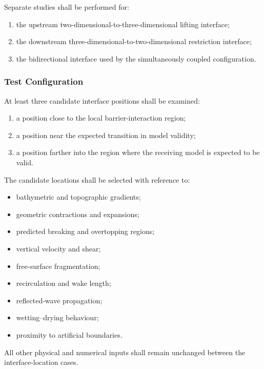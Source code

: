 Separate studies shall be performed for:

\begin{enumerate}
  \item the upstream two-dimensional-to-three-dimensional lifting
    interface;
  \item the downstream three-dimensional-to-two-dimensional
    restriction interface;
  \item the bidirectional interface used by the simultaneously coupled
    configuration.
\end{enumerate}

\subsubsection{Test Configuration}
\label{sec:res-ver-tst-interface-location-configuration}

At least three candidate interface positions shall be examined:

\begin{enumerate}
  \item a position close to the local barrier-interaction region;
  \item a position near the expected transition in model validity;
  \item a position farther into the region where the receiving model
    is expected to be valid.
\end{enumerate}

The candidate locations shall be selected with reference to:

\begin{itemize}
  \item bathymetric and topographic gradients;
  \item geometric contractions and expansions;
  \item predicted breaking and overtopping regions;
  \item vertical velocity and shear;
  \item free-surface fragmentation;
  \item recirculation and wake length;
  \item reflected-wave propagation;
  \item wetting--drying behaviour;
  \item proximity to artificial boundaries.
\end{itemize}

All other physical and numerical inputs shall remain unchanged between
the interface-location cases.


